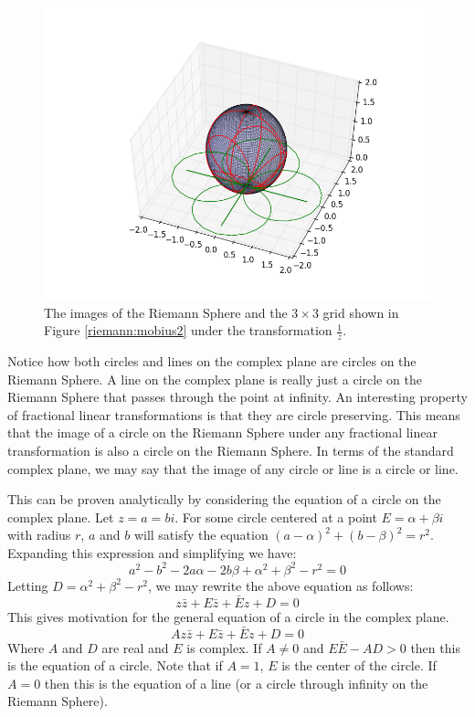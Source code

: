 \begin{figure}
\includegraphics[width=\textwidth]{mobius3.png}
\caption{The images of the Riemann Sphere and the $3\times 3$ grid shown in Figure \ref{riemann:mobius2} under the transformation $\frac{1}{z}$.}
\label{riemann:mobius3}
\end{figure}

Notice how both circles and lines on the complex plane are circles on the Riemann Sphere.
A line on the complex plane is really just a circle on the Riemann Sphere that passes through the point at infinity.
An interesting property of fractional linear transformations is that they are circle preserving.
This means that the image of a circle on the Riemann Sphere under any fractional linear transformation is also a circle on the Riemann Sphere.
In terms of the standard complex plane, we may say that the image of any circle or line is a circle or line.

This can be proven analytically by considering the equation of a circle on the complex plane.
Let $z=a=bi$.
For some circle centered at a point $E=\alpha + \beta i$ with radius $r$, $a$ and $b$ will satisfy the equation $(a-\alpha)^2+(b-\beta)^2=r^2$.
Expanding this expression and simplifying we have:
$$a^2-b^2-2a\alpha-2b\beta+\alpha^2+\beta^2-r^2=0$$
Letting $D=\alpha^2+\beta^2-r^2$, we may rewrite the above equation as follows:
$$z\bar{z}+E\bar{z}+\bar{E}z+D=0$$
This gives motivation for the general equation of a circle in the complex plane.
$$Az\bar{z}+E\bar{z}+\bar{E}z+D=0$$
Where $A$ and $D$ are real and $E$ is complex.
If $A\neq 0$ and $E\bar{E}-AD>0$ then this is the equation of a circle.
Note that if $A=1$, $E$ is the center of the circle.
If $A=0$ then this is the equation of a line (or a circle through infinity on the Riemann Sphere).


